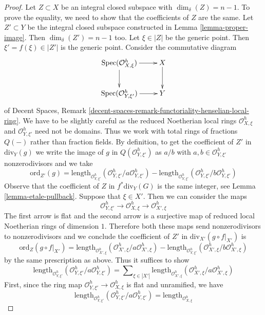 \documentclass[10pt,a4paper]{amsart}
\theoremstyle{plain}
\theoremstyle{definition}
\theoremstyle{remark}
\numberwithin{equation}{subsection}
\def\Spec{\mathop{\mathrm{Spec}}}
\begin{document}
\begin{proof}
\medskip\noindent
Let $Z \subset X$ be an integral closed subspace with $\dim_\delta(Z) = n - 1$.
To prove the equality, we need to show that the coefficients
of $Z$ are the same. Let $Z' \subset Y$ be the integral closed
subspace constructed in Lemma \ref{lemma-proper-image}.
Then $\dim_\delta(Z') = n - 1$ too. Let $\xi \in |Z|$ be the generic point.
Then $\xi' = f(\xi) \in |Z'|$ is the generic point.
Consider the commutative diagram
$$
\xymatrix{
\Spec(\mathcal{O}_{X, \xi}^h) \ar[r] \ar[d] & X \ar[d] \\
\Spec(\mathcal{O}_{Y, \xi'}^h) \ar[r] & Y
}
$$
of Decent Spaces, Remark
\ref{decent-spaces-remark-functoriality-henselian-local-ring}.
We have to be slightly careful as the reduced Noetherian local rings
$\mathcal{O}_{X, \xi}^h$ and $\mathcal{O}_{Y, \xi'}^h$ need not be domains.
Thus we work with total rings of fractions $Q(-)$ rather than fraction fields.
By definition, to get the coefficient of $Z'$ in $\text{div}_Y(g)$
we write the image of $g$ in $Q(\mathcal{O}_{Y, \xi'}^h)$
as $a/b$ with $a, b \in \mathcal{O}_{Y, \xi'}^h$ nonzerodivisors
and we take
$$
\text{ord}_{Z'}(g) =
\text{length}_{\mathcal{O}_{Y, \xi'}^h}
(\mathcal{O}_{Y, \xi'}^h/a \mathcal{O}_{Y, \xi'}^h) -
\text{length}_{\mathcal{O}_{Y, \xi'}^h}
(\mathcal{O}_{Y, \xi'}^h/b \mathcal{O}_{Y, \xi'}^h)
$$
Observe that the coefficient of $Z$ in $f^*\text{div}_Y(G)$
is the same integer, see Lemma \ref{lemma-etale-pullback}.
Suppose that $\xi \in X'$. Then we can consider the maps
$$
\mathcal{O}_{Y, \xi'}^h \to
\mathcal{O}_{X, \xi}^h \to
\mathcal{O}_{X', \xi}^h
$$
The first arrow is flat and the second arrow is a surjective
map of reduced local Noetherian rings of dimension $1$.
Therefore both these maps send nonzerodivisors to nonzerodivisors
and we conclude the coefficient of $Z'$ in $\text{div}_{X'}(g \circ f|_{X'})$
is
$$
\text{ord}_Z(g \circ f|_{X'}) =
\text{length}_{\mathcal{O}_{X', \xi}^h}
(\mathcal{O}_{X', \xi}^h/a \mathcal{O}_{X', \xi}^h) -
\text{length}_{\mathcal{O}_{Y, \xi'}^h}
(\mathcal{O}_{X', \xi}^h/b \mathcal{O}_{X', \xi}^h)
$$
by the same prescription as above. Thus it suffices to show
$$
\text{length}_{\mathcal{O}_{Y, \xi'}^h}
(\mathcal{O}_{Y, \xi'}^h/a \mathcal{O}_{Y, \xi'}^h) =
\sum\nolimits_{\xi \in |X'|}
\text{length}_{\mathcal{O}_{X', \xi}^h}
(\mathcal{O}_{X', \xi}^h/a \mathcal{O}_{X', \xi}^h)
$$
First, since the ring map $\mathcal{O}_{Y, \xi'}^h \to
\mathcal{O}_{X, \xi}^h$ is flat and unramified, we have
$$
\text{length}_{\mathcal{O}_{Y, \xi'}^h}
(\mathcal{O}_{Y, \xi'}^h/a \mathcal{O}_{Y, \xi'}^h) =
\text{length}_{\mathcal{O}_{X, \xi}^h}
$$
\end{proof}
\end{document}
